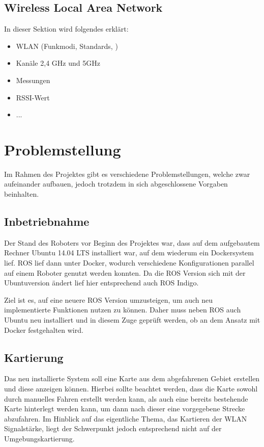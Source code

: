 \documentclass{scrartcl}%
\begin{document}
\subsection{Wireless Local Area Network}
In dieser Sektion wird folgendes erklärt:
\begin{itemize}
	\item WLAN (Funkmodi, Standards, )
	\item Kanäle 2,4 GHz und 5GHz
	\item Messungen
	\item RSSI-Wert
	\item ...
\end{itemize}

\newpage
\section{Problemstellung}
Im Rahmen des Projektes gibt es verschiedene Problemstellungen, welche zwar aufeinander aufbauen, jedoch trotzdem in sich abgeschlossene Vorgaben beinhalten.

\subsection{Inbetriebnahme}
Der Stand des Roboters vor Beginn des Projektes war, dass auf dem aufgebautem Rechner Ubuntu 14.04 LTS installiert war, auf dem wiederum ein Dockersystem lief. ROS lief dann unter Docker, wodurch verschiedene Konfigurationen parallel auf einem Roboter genutzt werden konnten. Da die ROS Version sich mit der Ubuntuversion ändert lief hier entsprechend auch ROS Indigo.

Ziel ist es, auf eine neuere ROS Version umzusteigen, um auch neu implementierte Funktionen nutzen zu können. Daher muss neben ROS auch Ubuntu neu installiert und in diesem Zuge geprüft werden, ob an dem Ansatz mit Docker festgehalten wird.

\subsection{Kartierung}
Das neu installierte System soll eine Karte aus dem abgefahrenen Gebiet erstellen und diese anzeigen können. Hierbei sollte beachtet werden, dass die Karte sowohl durch manuelles Fahren erstellt werden kann, als auch eine bereits bestehende Karte hinterlegt werden kann, um dann nach dieser eine vorgegebene Strecke abzufahren. Im Hinblick auf das eigentliche Thema, das Kartieren der WLAN Signalstärke, liegt der Schwerpunkt jedoch entsprechend nicht auf der Umgebungskartierung.
\end{document}
